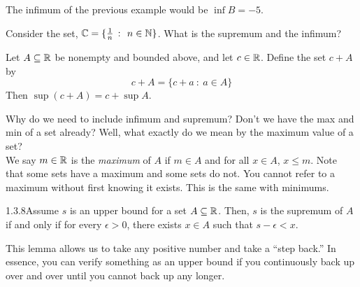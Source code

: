 The infimum of the previous example would be \(\inf B = -5\).

\begin{example}
    {}Consider the set, \(\C = \{\frac{1}{n} \ \colon \ n \in \N\}\). What is the supremum and the infimum?
\end{example}


\begin{example}
    Let \(A \subseteq \mathbb{R}\) be nonempty and bounded above, and let \(c \in \mathbb{R}\). Define the set \(c + A\) by \[c + A = \{c+a \ \colon \ a \in A\}\] Then \(\sup(c + A) = c + \sup A\).
\end{example}


Why do we need to include infimum and supremum? Don't we have the max and min of a set already? Well, what exactly do we mean by the \gls{maximum value} of a set? \\

We say \(m \in \mathbb{R}\) is the \textit{maximum} of \(A\) if \(m \in A\) and for all \(x\in A\), \(x \leq m\). Note that some sets have a maximum and some sets do not. You cannot refer to a maximum without first knowing it exists. This is the same with minimums.

\begin{lemma}
    {1.3.8}Assume \(s\) is an \gls{upper bound} for a set \(A \subseteq \mathbb{R}\). Then, \(s\) is the supremum of \(A\) if and only if for every \(\epsilon > 0\), there exists \(x\in A\) such that \(s - \epsilon < x\).
\end{lemma}

This lemma allows us to take any positive number and take a ``step back.'' In essence, you can verify something as an upper bound if you continuously back up over and over until you cannot back up any longer.

